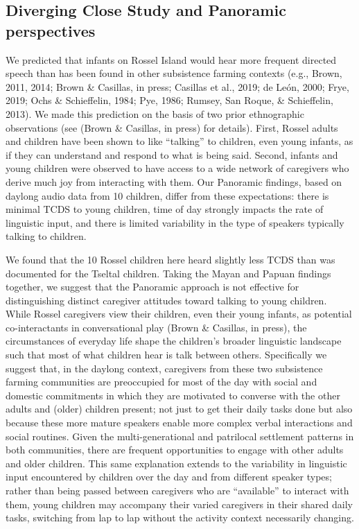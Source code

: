 \documentclass[,man,mask,floatsintext]{apa6}
\begin{document}
\subsection{Diverging Close Study and Panoramic
perspectives}\label{diverging-close-study-and-panoramic-perspectives}

We predicted that infants on Rossel Island would hear more frequent
directed speech than has been found in other subsistence farming
contexts (e.g., Brown, 2011, 2014; Brown \& Casillas, in press; Casillas
et al., 2019; de León, 2000; Frye, 2019; Ochs \& Schieffelin, 1984; Pye,
1986; Rumsey, San Roque, \& Schieffelin, 2013). We made this prediction
on the basis of two prior ethnographic observations (see (Brown \&
Casillas, in press) for details). First, Rossel adults and children have
been shown to like \enquote{talking} to children, even young infants, as
if they can understand and respond to what is being said. Second,
infants and young children were observed to have access to a wide
network of caregivers who derive much joy from interacting with them.
Our Panoramic findings, based on daylong audio data from 10 children,
differ from these expectations: there is minimal TCDS to young children,
time of day strongly impacts the rate of linguistic input, and there is
limited variability in the type of speakers typically talking to
children.

We found that the 10 Rossel children here heard slightly less TCDS than
was documented for the Tseltal children. Taking the Mayan and Papuan
findings together, we suggest that the Panoramic approach is not
effective for distinguishing distinct caregiver attitudes toward talking
to young children. While Rossel caregivers view their children, even
their young infants, as potential co-interactants in conversational play
(Brown \& Casillas, in press), the circumstances of everyday life shape
the children's broader linguistic landscape such that most of what
children hear is talk between others. Specifically we suggest that, in
the daylong context, caregivers from these two subsistence farming
communities are preoccupied for most of the day with social and domestic
commitments in which they are motivated to converse with the other
adults and (older) children present; not just to get their daily tasks
done but also because these more mature speakers enable more complex
verbal interactions and social routines. Given the multi-generational
and patrilocal settlement patterns in both communities, there are
frequent opportunities to engage with other adults and older children.
This same explanation extends to the variability in linguistic input
encountered by children over the day and from different speaker types;
rather than being passed between caregivers who are \enquote{available}
to interact with them, young children may accompany their varied
caregivers in their shared daily tasks, switching from lap to lap
without the activity context necessarily changing.
\end{document}
